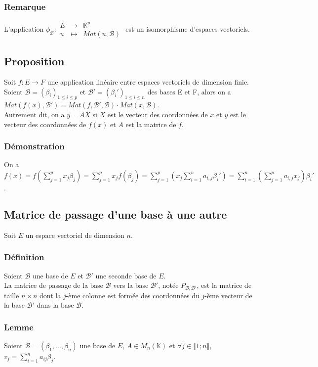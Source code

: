 \documentclass[a4paper,10pt]{book} %
\newcommand{\K}{\mathbb{K}}
\newcommand{\B}{\mathcal{B}}
\begin{document}
\subsubsection{Remarque}
L'application $\phi_\B : \begin{array}{rcl} E &\rightarrow& \K^p \\ u &\mapsto& Mat(u,\B) \end{array}$ est un isomorphisme d'espaces vectoriels.

\subsection{Proposition}
Soit $f:E\rightarrow F$ une application linéaire entre espaces vectoriels de dimension finie.\\
Soient $\B=(\beta_i)_{1\leq i\leq p}$ et $\B'=(\beta_i')_{1\leq i\leq n}$ des bases E et F, alors on a $Mat(f(x),\B')=Mat(f,\B',\B)\cdot Mat(x,\B)$.\\

Autrement dit, on a $y=AX$ si $X$ est le vecteur des coordonnées de $x$ et $y$ est le vecteur des coordonnées de $f(x)$ et $A$ est la matrice de $f$.

\subsubsection{Démonstration}
On a $\displaystyle f(x)=f\left(\sum\limits_{j=1}^px_j\beta_j\right)=\sum\limits_{j=1}^px_jf(\beta_j) =\sum\limits_{j=1}^p\left(x_j\sum\limits_{i=1}^na_{i,j}\beta_i'\right) =\sum\limits_{i=1}^n\left(\sum\limits_{j=1}^pa_{i,j}x_j\right)\beta_i'$.

\subsection{Matrice de passage d'une base à une autre}
Soit $E$ un espace vectoriel de dimension $n$.

\subsubsection{Définition}
Soient $\B$ une base de $E$ et $\B'$ une seconde base de $E$.\\
La matrice de passage de la base $\B$ vers la base $\B'$, notée $P_{\B,\B'}$, est la matrice de taille $n\times n$ dont la $j$-ème colonne est formée des coordonnées du $j$-ème vecteur de la base $\B'$ dans la base $\B$.

\subsubsection{Lemme}
Soient $\B=(\beta_{1},...,\beta_{n})$ une base de $E$, $A\in M_n(\mathbb{K})$ et $\forall j\in \llbracket 1;n \rrbracket$, $\displaystyle v_j=\sum_{i=1}^{n}a_{ij}\beta_{j}$.\\
\end{document}

